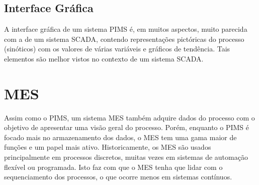 \subsection{Interface Gráfica}
A interface gráfica de um sistema PIMS é, em muitos aspectos, muito parecida com a de um sistema SCADA, contendo representações pictóricas do processo (sinóticos) com os valores de várias variáveis e gráficos de tendência. Tais elementos são melhor vistos no contexto de um sistema SCADA.

\section{MES}
Assim como o PIMS, um sistema MES também adquire dados do processo com o objetivo de apresentar uma visão geral do processo. Porém, enquanto o PIMS é focado mais no armazenamento dos dados, o MES tem uma gama maior de funções e um papel mais ativo. Historicamente, os MES são usados principalmente em processos discretos, muitas vezes em sistemas de automação flexível ou programada. Isto faz com que o MES tenha que lidar com o sequenciamento dos processos, o que ocorre menos em sistemas contínuos.

